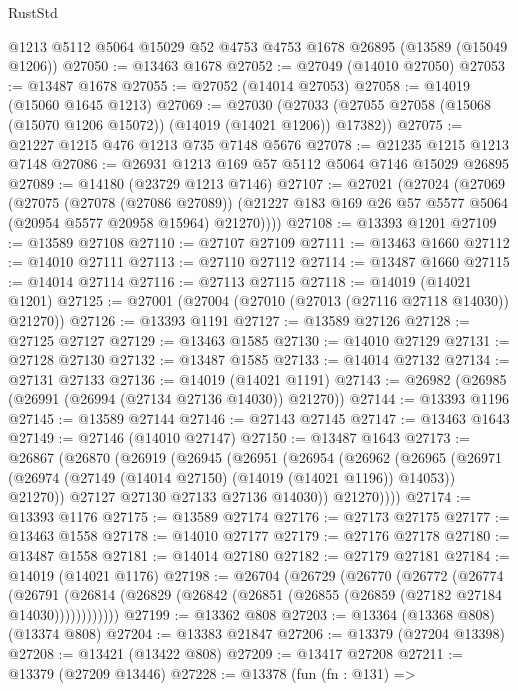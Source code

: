 \begin{lexlean}{RustStd}
\begin{coremodule}
    @1213
    @5112
    @5064
    @15029
    @52
    @4753
    @4753
    @1678
    @26895
    (@13589 (@15049 @1206))
@27050 := @13463 @1678
@27052 := @27049 (@14010 @27050)
@27053 := @13487 @1678
@27055 := @27052 (@14014 @27053)
@27058 := @14019 (@15060 @1645 @1213)
@27069 := @27030
    (@27033 (@27055 @27058 (@15068 (@15070 @1206 @15072)) (@14019 (@14021 @1206)) @17382))
@27075 := @21227 @1215 @476 @1213 @735 @7148 @5676
@27078 := @21235 @1215 @1213 @7148
@27086 := @26931 @1213 @169 @57 @5112 @5064 @7146 @15029 @26895
@27089 := @14180 (@23729 @1213 @7146)
@27107 := @27021
    (@27024
      (@27069
        (@27075
          (@27078 (@27086 @27089))
          (@21227 @183 @169 @26 @57 @5577 @5064 (@20954 @5577 @20958 @15964) @21270))))
@27108 := @13393 @1201
@27109 := @13589 @27108
@27110 := @27107 @27109
@27111 := @13463 @1660
@27112 := @14010 @27111
@27113 := @27110 @27112
@27114 := @13487 @1660
@27115 := @14014 @27114
@27116 := @27113 @27115
@27118 := @14019 (@14021 @1201)
@27125 := @27001 (@27004 (@27010 (@27013 (@27116 @27118 @14030)) @21270))
@27126 := @13393 @1191
@27127 := @13589 @27126
@27128 := @27125 @27127
@27129 := @13463 @1585
@27130 := @14010 @27129
@27131 := @27128 @27130
@27132 := @13487 @1585
@27133 := @14014 @27132
@27134 := @27131 @27133
@27136 := @14019 (@14021 @1191)
@27143 := @26982 (@26985 (@26991 (@26994 (@27134 @27136 @14030)) @21270))
@27144 := @13393 @1196
@27145 := @13589 @27144
@27146 := @27143 @27145
@27147 := @13463 @1643
@27149 := @27146 (@14010 @27147)
@27150 := @13487 @1643
@27173 := @26867
    (@26870
      (@26919
        (@26945
          (@26951
            (@26954
              (@26962
                (@26965
                  (@26971 (@26974 (@27149 (@14014 @27150) (@14019 (@14021 @1196)) @14053)) @21270))
                @27127
                @27130
                @27133
                @27136
                @14030))
            @21270))))
@27174 := @13393 @1176
@27175 := @13589 @27174
@27176 := @27173 @27175
@27177 := @13463 @1558
@27178 := @14010 @27177
@27179 := @27176 @27178
@27180 := @13487 @1558
@27181 := @14014 @27180
@27182 := @27179 @27181
@27184 := @14019 (@14021 @1176)
@27198 := @26704
    (@26729
      (@26770
        (@26772
          (@26774
            (@26791
              (@26814 (@26829 (@26842 (@26851 (@26855 (@26859 (@27182 @27184 @14030))))))))))))
@27199 := @13362 @808
@27203 := @13364 (@13368 @808) (@13374 @808)
@27204 := @13383 @21847
@27206 := @13379 (@27204 @13398)
@27208 := @13421 (@13422 @808)
@27209 := @13417 @27208
@27211 := @13379 (@27209 @13446)
@27228 := @13378
    (fun (fn : @131) =>

\end{coremodule}
\end{lexlean}
